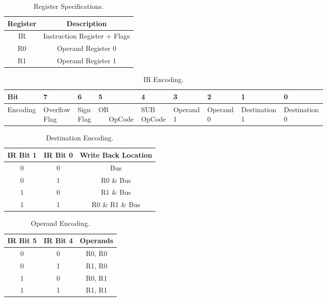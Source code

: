\documentclass{article}
\begin{document}
\begin{table}[h!]
    \centering
    \begin{tabular}{|c||c|} 
        \hline
        Register & Description \\
        \hline
        \hline
        IR & Instruction Register + Flags \\
        \hline
        R0 & Operand Register 0 \\
        \hline
        R1 & Operand Register 1 \\
        \hline
    \end{tabular}
    \caption{Register Specifications.}
    \label{tab:regs}
\end{table}

\begin{table}[h!]
    \centering
    \begin{tabular}{|p{0.09\linewidth}||p{0.075\linewidth}|p{0.06\linewidth}|p{0.0775\linewidth}|p{0.0775\linewidth}|p{0.085\linewidth}|p{0.085\linewidth}|p{0.1\linewidth}|p{0.1\linewidth}|} 
        \hline
        Bit & 7 & 6 & 5 & 4 & 3 & 2 & 1 & 0 \\
        \hline
        \hline
        Encoding & Overflow Flag & Sign Flag & OR \ \ \ OpCode & SUB OpCode & Operand 1 & Operand 0 & Destination 1 & Destination 0 \\
        \hline
    \end{tabular}
    \caption{IR Encoding.}
    \label{tab:irenc}
\end{table}

\begin{table}[h!]
    \centering
    \begin{tabular}{|c|c||c|} 
        \hline
        IR Bit 1 & IR Bit 0 & Write Back Location \\
        \hline
        \hline
        0 & 0 & Bus \\
        \hline
        0 & 1 & R0 \& Bus \\
        \hline
        1 & 0 & R1 \& Bus \\
        \hline
        1 & 1 & R0 \& R1 \& Bus \\
        \hline
    \end{tabular}
    \caption{Destination Encoding.}
    \label{tab:destenc}
\end{table}

\begin{table}[h!]
    \centering
    \begin{tabular}{|c|c||c|} 
        \hline
        IR Bit 5 & IR Bit 4 & Operands \\
        \hline
        \hline
        0 & 0 & R0, R0 \\
        \hline
        0 & 1 & R1, R0 \\
        \hline
        1 & 0 & R0, R1 \\
        \hline
        1 & 1 & R1, R1 \\
        \hline
    \end{tabular}
    \caption{Operand Encoding.}
    \label{tab:openc}
\end{table}
\end{document}
